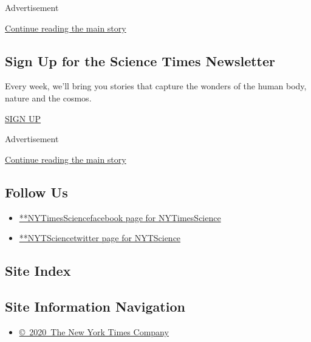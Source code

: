 Advertisement

\protect\hyperlink{after-mid3}{Continue reading the main story}

\hypertarget{sign-up-for-the-science-times-newsletter}{%
\subsection{Sign Up for the Science Times
Newsletter}\label{sign-up-for-the-science-times-newsletter}}

Every week, we'll bring you stories that capture the wonders of the
human body, nature and the cosmos.

\href{/newsletters/signup/SC}{SIGN UP}

Advertisement

\protect\hyperlink{after-mktg}{Continue reading the main story}

\hypertarget{follow-us}{%
\subsection{Follow Us}\label{follow-us}}

\begin{itemize}
\tightlist
\item
  \href{https://www.facebookcorewwwi.onion/NYTimesScience}{**NYTimesSciencefacebook
  page for NYTimesScience}
\item
  \href{https://twitter.com/NYTScience}{**NYTSciencetwitter page for
  NYTScience}
\end{itemize}

\hypertarget{site-index}{%
\subsection{Site Index}\label{site-index}}

\hypertarget{site-information-navigation}{%
\subsection{Site Information
Navigation}\label{site-information-navigation}}

\begin{itemize}
\tightlist
\item
  \href{https://help.nytimes3xbfgragh.onion/hc/en-us/articles/115014792127-Copyright-notice}{©~2020~The
  New York Times Company}
\end{itemize}

